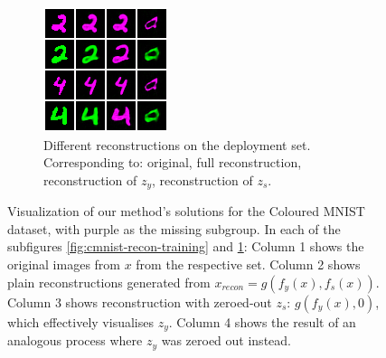 \begin{figure}[tb]
\begin{subfigure}[b]{0.39\textwidth}
    \includegraphics[width=\textwidth]{paper3/example_images/fresh-dawn-2179_context_reconstructions_9900.png}
    \caption{
    Different reconstructions on the deployment set.
    Corresponding to: original, full reconstruction, reconstruction of $z_y$, reconstruction of $z_s$.
    }%
    \label{fig:cmnist-recon-deployment}
  \end{subfigure}
  \caption{
   Visualization of our method's solutions for the Coloured MNIST dataset, with {\color{purple}purple} as the missing subgroup.
   In each of the subfigures \ref{fig:cmnist-recon-training} and \ref{fig:cmnist-recon-deployment}:
   Column 1 shows the original images from $x$ from the respective set.
   Column 2 shows plain reconstructions generated from $x_\textit{recon}=g(f_y(x), f_s(x))$.
   Column 3 shows reconstruction with zeroed-out $z_s$: $g(f_y(x), 0)$, which effectively visualises $z_y$.
   Column 4 shows the result of an analogous process where $z_y$ was zeroed out instead.
  }%
  \label{fig:cmnist-recon}
\end{figure}

